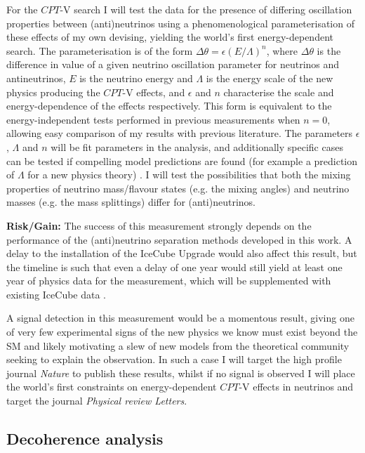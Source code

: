 \documentclass[a4paper,11pt]{article}
\begin{document}
For the $CPT$-V search I will test the data for the presence of differing oscillation properties between (anti)neutrinos using a phenomenological parameterisation of these effects of my own devising, yielding the world's first energy-dependent search. The parameterisation is of the form $\Delta \theta = \epsilon (E/\Lambda)^n$, where $\Delta \theta$ is the difference in value of a given neutrino oscillation parameter for neutrinos and antineutrinos, $E$ is the neutrino energy and $\Lambda$ is the energy scale of the new physics producing the $CPT$-V effects, and $\epsilon$ and $n$ characterise the scale and energy-dependence of the effects respectively. This form is equivalent to the energy-independent tests performed in previous measurements when $n=0$, allowing easy comparison of my results with previous literature. The parameters $\epsilon$, $\Lambda$ and $n$ will be fit parameters in the analysis, and additionally specific cases can be tested if compelling model predictions are found (for example a prediction of $\Lambda$ for a new physics theory) . I will test the possibilities that both the mixing properties of neutrino mass/flavour states (e.g. the mixing angles) and neutrino masses (e.g. the mass splittings) differ for (anti)neutrinos. 

\textbf{Risk/Gain:} The success of this measurement strongly depends on the performance of the (anti)neutrino separation methods developed in this work. A delay to the installation of the IceCube Upgrade would also affect this result, but the timeline is such that even a delay of one year would still yield at least one year of physics data for the measurement, which will be supplemented with existing IceCube data .

A signal detection in this measurement would be a momentous result, giving one of very few experimental signs of the new physics we know must exist beyond the SM and likely motivating a slew of new models from the theoretical community seeking to explain the observation. In such a case I will target the high profile journal \textit{Nature} to publish these results, whilst if no signal is observed I will place the world's first constraints on energy-dependent $CPT$-V effects in neutrinos and target the journal \textit{Physical review Letters}.\\

\subsection{Decoherence analysis}
\end{document}
